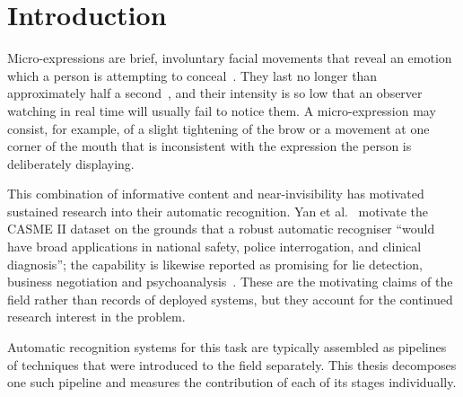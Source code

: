%
%
%
%

\chapter{Introduction}
\label{ch:introduction}

Micro-expressions are brief, involuntary facial movements that reveal an emotion which a person is attempting to conceal~\cite{yan2014}. They last no longer than approximately half a second~\cite{yan2014}, and their intensity is so low that an observer watching in real time will usually fail to notice them. A micro-expression may consist, for example, of a slight tightening of the brow or a movement at one corner of the mouth that is inconsistent with the expression the person is deliberately displaying.

This combination of informative content and near-invisibility has motivated sustained research into their automatic recognition. Yan et al.~\cite{yan2014} motivate the CASME II dataset on the grounds that a robust automatic recogniser ``would have broad applications in national safety, police interrogation, and clinical diagnosis''; the capability is likewise reported as promising for lie detection, business negotiation and psychoanalysis~\cite{xia2020a}. These are the motivating claims of the field rather than records of deployed systems, but they account for the continued research interest in the problem.

Automatic recognition systems for this task are typically assembled as pipelines of techniques that were introduced to the field separately. This thesis decomposes one such pipeline and measures the contribution of each of its stages individually.


